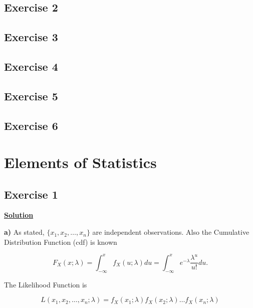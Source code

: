 \documentclass{article}
\begin{document}
\subsection{Exercise 2} 


\subsection{Exercise 3} 


\subsection{Exercise 4}


\subsection{Exercise 5}


\subsection{Exercise 6}


\section{Elements of Statistics} \label{th3}

\subsection{Exercise 1}

\vspace{2mm}

\begin{center}
    {\textbf{\underline{Solution}}}
\end{center}
\vspace{2mm}

\noindent\textbf{a)} As stated, $\{x_1, x_2,\dots, x_n\}$ are independent observations. Also the Cumulative Distribution Function (cdf) is known

\begin{equation}
    F_X(x;\lambda)=\int_{-\infty}^{x}{f_X(u;\lambda)du}=\int_{-\infty}^{x}{e^{-\lambda}\frac{\lambda^{u}}{u!}du}.\nonumber
\end{equation}

\noindent The Likelihood Function is

\begin{equation}
L(x_1, x_2,\dots, x_n;\lambda)=f_X(x_1;\lambda)f_X(x_2;\lambda)\dots f_X(x_n;\lambda)\nonumber
\end{equation}
\end{document}
